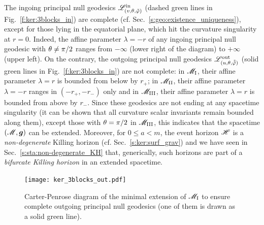 The ingoing principal null geodesics $\mathscr{L}^{\rm in}_{(v,\theta,{\tilde\varphi})}$ (dashed green lines in
Fig.~\ref{f:ker:3blocks_in}) are complete (cf. Sec.~\ref{s:geo:existence_uniqueness}),
except for those lying in the equatorial plane, which hit the curvature singularity
at $r=0$. Indeed, the affine parameter
$\lambda=-r$ of any ingoing principal null geodesic with $\theta\neq \pi/2$
ranges from $-\infty$ (lower right of the diagram) to $+\infty$ (upper left). On the contrary, the outgoing principal null geodesics $\mathscr{L}^{\rm out}_{(u,\theta,\tilde{{\tilde\varphi}})}$ (solid green lines in
Fig.~\ref{f:ker:3blocks_in}) are not complete: in $\mathscr{M}_{\rm I}$, their affine parameter
$\lambda=r$ is bounded from below by $r_+$; in $\mathscr{M}_{\rm II}$, their affine parameter
$\lambda=-r$ ranges in $(-r_+,-r_-)$ only and in $\mathscr{M}_{\rm III}$, their affine parameter
$\lambda=r$ is bounded from above by $r_-$.
Since these geodesics are not ending at any spacetime singularity
(it can be shown that all curvature scalar invariants remain bounded along
them), except those with $\theta=\pi/2$ in $\mathscr{M}_{\rm III}$,
this indicates that the spacetime $(\mathscr{M},\bm{g})$
can be extended. Moreover, for $0\leq a < m$,
the event horizon  $\mathscr{H}$ is a
\emph{non-degenerate} Killing horizon (cf. Sec.~\ref{s:ker:surf_grav})
and we have seen in Sec.~\ref{s:sta:non-degenerate_KH} that, generically,
such horizons are part of a \emph{bifurcate Killing horizon}
in an extended spacetime.


\begin{figure}
\centerline{\texttt{[image: ker\_3blocks\_out.pdf]}}
\caption[]{\label{f:ker:3blocks_out} \footnotesize
Carter-Penrose diagram of the minimal extension of $\mathscr{M}_{\rm I}$ to ensure
complete outgoing principal null geodesics (one of them is drawn as a solid green line).}
\end{figure}


